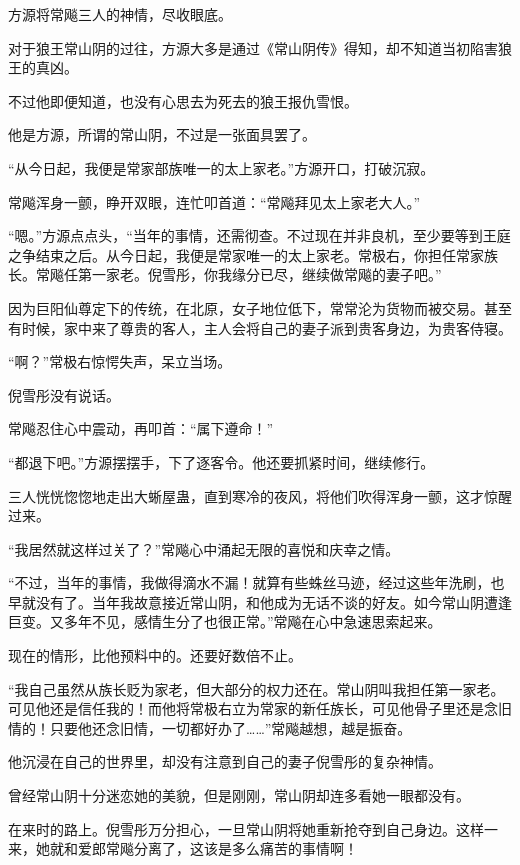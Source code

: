 
\begin{this_body}

方源将常飚三人的神情，尽收眼底。

对于狼王常山阴的过往，方源大多是通过《常山阴传》得知，却不知道当初陷害狼王的真凶。

不过他即便知道，也没有心思去为死去的狼王报仇雪恨。

他是方源，所谓的常山阴，不过是一张面具罢了。

“从今日起，我便是常家部族唯一的太上家老。”方源开口，打破沉寂。

常飚浑身一颤，睁开双眼，连忙叩首道：“常飚拜见太上家老大人。”

“嗯。”方源点点头，“当年的事情，还需彻查。不过现在并非良机，至少要等到王庭之争结束之后。从今日起，我便是常家唯一的太上家老。常极右，你担任常家族长。常飚任第一家老。倪雪彤，你我缘分已尽，继续做常飚的妻子吧。”

因为巨阳仙尊定下的传统，在北原，女子地位低下，常常沦为货物而被交易。甚至有时候，家中来了尊贵的客人，主人会将自己的妻子派到贵客身边，为贵客侍寝。

“啊？”常极右惊愕失声，呆立当场。

倪雪彤没有说话。

常飚忍住心中震动，再叩首：“属下遵命！”

“都退下吧。”方源摆摆手，下了逐客令。他还要抓紧时间，继续修行。

三人恍恍惚惚地走出大蜥屋蛊，直到寒冷的夜风，将他们吹得浑身一颤，这才惊醒过来。

“我居然就这样过关了？”常飚心中涌起无限的喜悦和庆幸之情。

“不过，当年的事情，我做得滴水不漏！就算有些蛛丝马迹，经过这些年洗刷，也早就没有了。当年我故意接近常山阴，和他成为无话不谈的好友。如今常山阴遭逢巨变。又多年不见，感情生分了也很正常。”常飚在心中急速思索起来。

现在的情形，比他预料中的。还要好数倍不止。

“我自己虽然从族长贬为家老，但大部分的权力还在。常山阴叫我担任第一家老。可见他还是信任我的！而他将常极右立为常家的新任族长，可见他骨子里还是念旧情的！只要他还念旧情，一切都好办了……”常飚越想，越是振奋。

他沉浸在自己的世界里，却没有注意到自己的妻子倪雪彤的复杂神情。

曾经常山阴十分迷恋她的美貌，但是刚刚，常山阴却连多看她一眼都没有。

在来时的路上。倪雪彤万分担心，一旦常山阴将她重新抢夺到自己身边。这样一来，她就和爱郎常飚分离了，这该是多么痛苦的事情啊！


\end{this_body}
